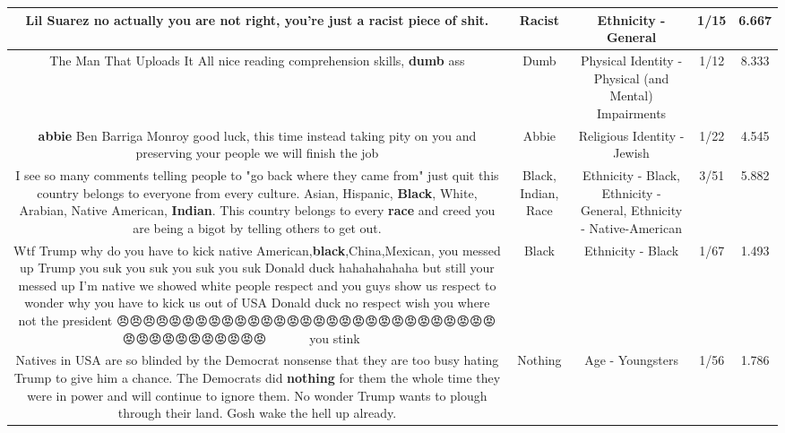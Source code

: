 \documentclass[11pt]{article}
\newlength\mylength
\begin{document}
\begin{center}
\begin{longtable}{|C{.65\mylength}|C{.30\mylength}|C{.12\mylength}|C{.12\mylength}|C{.12\mylength}|}
  \small Lil Suarez no actually you are not right, you're just a \textbf{racist} piece of shit.\normalsize   & Racist & Ethnicity - General & 1/15 & 6.667 \\  \hline
  \small The Man That Uploads It All nice reading comprehension skills, \textbf{dumb} ass\normalsize   & Dumb & Physical Identity - Physical (and Mental) Impairments & 1/12 & 8.333 \\  \hline
  \small \@\textbf{abbie} Ben Barriga Monroy good luck, this time instead taking pity on you and preserving your people we will finish the job\normalsize   & Abbie & Religious Identity - Jewish & 1/22 & 4.545 \\  \hline
  \small I see so many comments telling people to "go back where they came from" just quit this country belongs to everyone from every culture. Asian, Hispanic, \textbf{Black}, White, Arabian, Native American, \textbf{Indian}. This country belongs to every \textbf{race} and creed you are being a bigot by telling others to get out.\normalsize   & Black, Indian, Race & Ethnicity - Black, Ethnicity - General, Ethnicity - Native-American & 3/51 & 5.882 \\  \hline
  \small Wtf Trump why do you have to kick native American,\textbf{black},China,Mexican, you messed up Trump you suk you suk you suk you suk Donald duck hahahahahaha but still your messed up I'm native we showed white people respect and you guys  show us respect to wonder why you have to kick us out  of USA Donald duck no respect wish you where not the president 😠😠😠😠😡😡😡😡😡😡😡😡😡😡😡😡😡😡😡😡😡😡😡😡😡😡😡😡😡😡😡😡😡😡😡😡😡😡😡😡👿👿👿👿👿👿👿👿👿👿👿 you stink👿👿👿👿👿👿👿👿👿\normalsize   & Black & Ethnicity - Black & 1/67 & 1.493 \\  \hline
  \small Natives in USA are so blinded by the Democrat nonsense that they are too busy hating Trump to give him a chance. The Democrats did \textbf{nothing} for them the whole time they were in power and will continue to ignore them. No wonder Trump wants to plough through their land. Gosh wake the hell up already.\normalsize   & Nothing & Age - Youngsters & 1/56 & 1.786 \\  \hline

\end{longtable}
\end{center}
\end{document}
